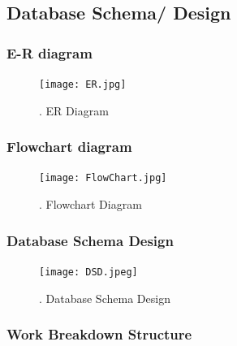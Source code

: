 \documentclass{article}
\begin{document}
\begin{flushleft}
\begin{enumerate}
\begin{center}
\begin{table}[!ht]
\begin{tabular}{ | m{7em} | m{7cm} | }
            \end{tabular}
           \end{table}
           
           \end{center}
            \end{enumerate}
        \newpage
        \subsection{Database Schema/ Design}
            \subsubsection{E-R diagram}
            \begin{figure}[!ht]
              
              \texttt{[image: ER.jpg]}
              
              \caption{ .  ER Diagram}
            \end{figure}
            \newpage
            \subsubsection{Flowchart diagram}
             \begin{figure}[!ht]
              
              \texttt{[image: FlowChart.jpg]}
              \renewcommand{\thefigure}{ \thesubsection.\arabic{figure}}
              \caption{ .  Flowchart Diagram}
            \end{figure}
            \newpage
            \subsubsection{Database Schema Design}
             \begin{figure}[!ht]
              
              \texttt{[image: DSD.jpeg]}
              \renewcommand{\thefigure}{ \thesubsection.\arabic{figure}}
              \caption{ .  Database Schema Design}
            \end{figure}
           
\newpage
            \subsubsection{Work Breakdown Structure}
            \begin{figure}[!ht]
              

\end{figure}
\end{flushleft}
\end{document}
